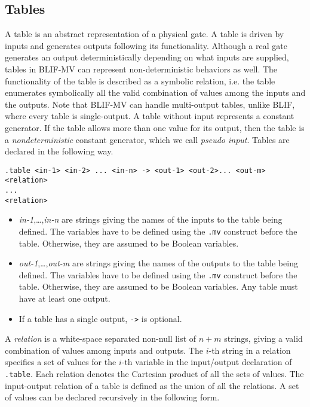 \subsection{Tables}
A table is an abstract representation of a physical gate.
A table is driven by inputs and generates outputs
following its functionality.
Although
a real gate generates an output deterministically
depending on what inputs are supplied,
tables in BLIF-MV can represent
non-deterministic behaviors as well.
The functionality of the table is described
as a symbolic relation,
i.e. the table enumerates symbolically all the
valid combination of values among the inputs and the outputs.
Note that BLIF-MV can handle multi-output tables,
unlike BLIF, where every table is single-output.
A table without input
represents a constant generator.
If the table allows more than
one value for its output, then the table
is a {\em nondeterministic} constant generator,
which we call {\em pseudo input}.
Tables are declared in the following way.

\begin{verbatim}
.table <in-1> <in-2> ... <in-n> -> <out-1> <out-2>... <out-m>
<relation>
...
<relation>
\end{verbatim}

\begin{itemize}
\item {\em in-1},\ldots,{\em in-n} are strings
giving the names of the inputs to the table being defined.
The variables have to be defined using the {\tt .mv} construct
before the table. Otherwise, they are assumed to be Boolean variables.
\item {\em out-1},\ldots,{\em out-m} are strings
giving the names of the outputs to the table being defined.
The variables have to be defined using the {\tt .mv} construct
before the table. Otherwise, they are assumed to be Boolean variables.
Any table must have at least one output.
\item If a table has a single output,
{\tt ->} is optional.
\end{itemize}

A {\em relation} is a white-space separated non-null list of $n+m$ strings,
giving a valid combination of values among inputs and outputs.
The $i$-th string in a relation specifies a set of values for the $i$-th variable
in the input/output declaration of {\tt .table}.
Each relation denotes
the Cartesian product of all the sets of values.
The input-output relation of a table is defined
as the union of all the relations.
A set of values
can be declared recursively in the following form.


